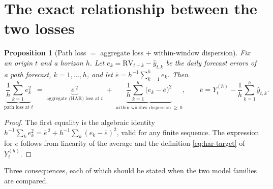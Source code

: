 \documentclass[11pt,a4paper]{article}
\newcommand{\RV}{\mathrm{RV}}
\newtheorem{proposition}{Proposition}
\begin{document}
\section{The exact relationship between the two losses}
\label{sec:decomposition}

\begin{proposition}[Path loss $=$ aggregate loss $+$ within-window dispersion]
\label{prop:decomp}
Fix an origin $t$ and a horizon $h$. Let $e_k=\RV_{t+k}-\hat{y}_{t,k}$ be the daily forecast
errors of a path forecast, $k=1,\dots,h$, and let
$\bar{e}=h^{-1}\sum_{k=1}^{h}e_k$. Then
\begin{equation}
  \underbrace{\frac{1}{h}\sum_{k=1}^{h}e_k^{2}}_{\text{path loss at }t}
  \;=\;
  \underbrace{\bar{e}^{\,2}}_{\text{aggregate (HAR) loss at }t}
  \;+\;
  \underbrace{\frac{1}{h}\sum_{k=1}^{h}\bigl(e_k-\bar{e}\bigr)^{2}}_{\text{within-window dispersion}\;\ge\,0},
  \qquad
  \bar{e}=Y^{(h)}_{t}-\frac{1}{h}\sum_{k=1}^{h}\hat{y}_{t,k}.
  \label{eq:decomp}
\end{equation}
\end{proposition}

\begin{proof}
The first equality is the algebraic identity
$h^{-1}\sum_k e_k^2 = \bar{e}^{\,2}+h^{-1}\sum_k(e_k-\bar{e})^2$, valid for any finite
sequence. The expression for $\bar{e}$ follows from linearity of the average and the
definition \eqref{eq:har-target} of $Y^{(h)}_{t}$.
\end{proof}

Three consequences, each of which should be stated when the two model families are compared.
\end{document}
